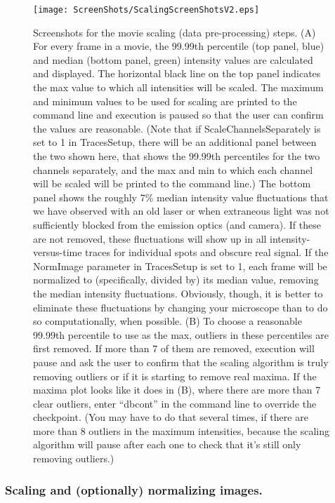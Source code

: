 \documentclass[11pt]{article}
\begin{document}
\begin{figure}
\begin{center}
\texttt{[image: ScreenShots/ScalingScreenShotsV2.eps]}
\caption{Screenshots for the movie scaling (data pre-processing) steps. (A) For every frame in a movie, the 99.99th percentile (top panel, blue) and median (bottom panel, green) intensity values are calculated and displayed.  The horizontal black line on the top panel indicates the max value to which all intensities will be scaled.  %
The maximum and minimum values to be used for scaling are printed to the command line and execution is paused so that the user can confirm the values are reasonable. (Note that if ScaleChannelsSeparately is set to 1 in TracesSetup, there will be an additional panel between the two shown here, that shows the 99.99th percentiles for the two channels separately, and the max and min to which each channel will be scaled will be printed to the command line.)  The bottom panel shows the roughly 7\% median intensity value fluctuations that we have observed with an old laser or when extraneous light was not sufficiently blocked from the emission optics (and camera).  If these are not removed, these fluctuations will show up in all intensity-versus-time traces for individual spots and obscure real signal.  If the NormImage parameter in TracesSetup is set to 1, each frame will be normalized to (specifically, divided by) its median value, removing the median intensity fluctuations. Obviously, though, it is better to eliminate these fluctuations by changing your microscope than to do so computationally, when possible.  (B) To choose a reasonable 99.99th percentile to use as the max, outliers in these percentiles are first removed. If more than 7 of them are removed, execution will pause and ask the user to confirm that the scaling algorithm is truly removing outliers or if it is starting to remove real maxima.  If the maxima plot looks like it does in (B), where there are more than 7 clear outliers, enter ``dbcont'' in the command line to override the checkpoint.  (You may have to do that several times, if there are more than 8 outliers in the maximum intensities, because the scaling algorithm will pause after each one to check that it's still only removing outliers.)}
\label{fig:ScaleMovieShot}
\end{center}
\end{figure}

\subsubsection{Scaling and (optionally) normalizing images.}
\end{document}
